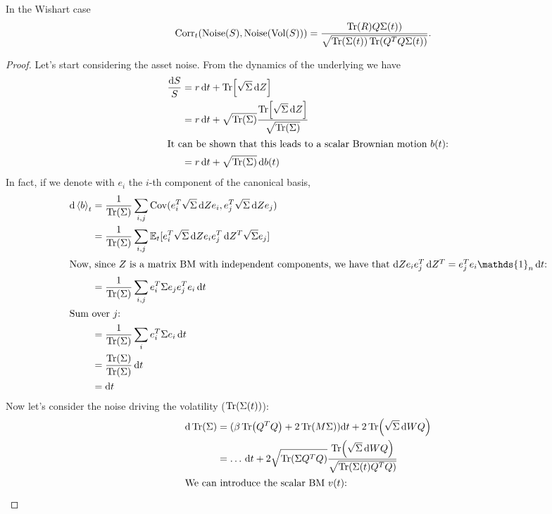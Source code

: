 \begin{proposition}
    In the Wishart case
    \begin{align}
        \operatorname{Corr}_t(\text{Noise}(S), \text{Noise}(\text{Vol}(S))) &= \frac{\Tr(R)Q\Sigma(t))}{\sqrt{\Tr(\Sigma(t))\Tr(Q^TQ\Sigma(t))}}.
    \end{align}
\end{proposition}%
\begin{proof}
    Let's start considering the asset noise. From the dynamics of the underlying we have
    \begin{align*}
        \frac{\dd S}{S} &= r\,\dd t + \Tr[\sqrt{\Sigma}\,\dd Z] \\
        &=
        r\,\dd t + \sqrt{\Tr(\Sigma)}\frac{\Tr[\sqrt{\Sigma}\,\dd Z]}{\sqrt{\Tr(\Sigma)}} \\
        \intertext{It can be shown that this leads to a scalar Brownian motion $b(t)$:}
        &=
        r\,\dd t + \sqrt{\Tr(\Sigma)}\,\dd b(t)
    \end{align*}
    In fact, if we denote with $e_i$ the $i$-th component of the canonical basis,
    \begin{align*}
        \dd\expval{b}_t &= \frac{1}{\Tr(\Sigma)}\sum_{i,j}\Cov(e^T_i\sqrt{\Sigma}\,\dd Z e_i, e^T_j\sqrt{\Sigma}\,\dd Z e_j) \\
        &=
        \frac{1}{\Tr(\Sigma)} \sum_{i,j}\mathbb{E}_t[e^T_i\sqrt{\Sigma}\,\dd Z e_i e^T_j\,\dd Z^T \sqrt{\Sigma} e_j] \\
        \intertext{Now, since $Z$ is a matrix BM with independent components, we have that $\dd Z e_i e^T_j\,\dd Z^T = e^T_je_i\mathds{1}_n\,\dd t$:}
        &=
        \frac{1}{\Tr(\Sigma)} \sum_{i,j} e^T_i\Sigma e_je_j^Te_i\,\dd t \\
        \intertext{Sum over $j$:}
        &=
        \frac{1}{\Tr(\Sigma)} \sum_{i} e^T_i\Sigma e_i\,\dd t \\
        &=
        \frac{\Tr(\Sigma)}{\Tr(\Sigma)}\,\dd t \\
        &=
        \dd t
    \end{align*}
    Now let's consider the noise driving the volatility ($\Tr(\Sigma(t))$):
    \begin{align*}
        \dd\Tr(\Sigma) &= (\beta\Tr(Q^TQ)+2\Tr(M\Sigma))\dd t + 2\Tr(\sqrt{\Sigma}\,\dd W Q) \\
        &=
        \dots\,\dd t + 2\sqrt{\Tr(\Sigma Q^TQ)}\frac{\Tr(\sqrt{\Sigma}\,\dd WQ)}{\sqrt{\Tr(\Sigma(t)Q^TQ)}} \\
        \intertext{We can introduce the scalar BM $v(t)$:}

\end{align*}
\end{proof}
